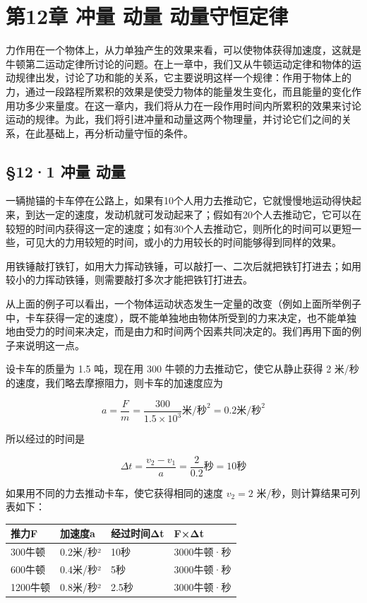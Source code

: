 \chapter{第12章 冲量 动量
动量守恒定律}\label{ux7b2c12ux7ae0-ux51b2ux91cf-ux52a8ux91cf-ux52a8ux91cfux5b88ux6052ux5b9aux5f8b}

力作用在一个物体上，从力单独产生的效果来看，可以使物体获得加速度，这就是牛顿第二运动定律所讨论的问题。在上一章中，我们又从牛顿运动定律和物体的运动规律出发，讨论了功和能的关系，它主要说明这样一个规律：作用于物体上的力，通过一段路程所累积的效果是使受力物体的能量发生变化，而且能量的变化作用功多少来量度。在这一章内，我们将从力在一段作用时间内所累积的效果来讨论运动的规律。为此，我们将引进冲量和动量这两个物理量，并讨论它们之间的关系，在此基础上，再分析动量守恒的条件。

\section{§12·1 冲量 动量}\label{ux51b2ux91cf-ux52a8ux91cf}

一辆抛锚的卡车停在公路上，如果有10个人用力去推动它，它就慢慢地运动得快起来，到达一定的速度，发动机就可发动起来了；假如有20个人去推动它，它可以在较短的时间内获得这一定的速度；如有30个人去推动它，则所化的时间可以更短一些，可见大的力用较短的时间，或小的力用较长的时间能够得到同样的效果。

用铁锤敲打铁钉，如用大力挥动铁锤，可以敲打一、二次后就把铁钉打进去；如用较小的力挥动铁锤，则需要敲打多次才能把铁钉打进去。

从上面的例子可以看出，一个物体运动状态发生一定量的改变（例如上面所举例子中，卡车获得一定的速度），既不能单独地由物体所受到的力来决定，也不能单独地由受力的时间来决定，而是由力和时间两个因素共同决定的。我们再用下面的例子来说明这一点。

设卡车的质量为 1.5 吨，现在用 300 牛顿的力去推动它，使它从静止获得 2
米/秒的速度，我们略去摩擦阻力，则卡车的加速度应为

\[
a = \frac {F}{m} = \frac {300}{1.5 \times 10 ^ {3}} \text{米/秒} ^ {2} = 0.2 \text{米/秒} ^ {2}
\]

所以经过的时间是

\[
\Delta t = \frac {v _ {2} - v _ {1}}{a} = \frac {2}{0.2} \text{秒} = 10 \text{秒}
\]

如果用不同的力去推动卡车，使它获得相同的速度 \(v_{2}=2\)
米/秒，则计算结果可列表如下：

{\def\LTcaptype{none} %
\begin{longtable}[]{@{}llll@{}}
\toprule\noalign{}
推力F & 加速度a & 经过时间Δt & F×Δt \\
\midrule\noalign{}
\endhead
\bottomrule\noalign{}
\endlastfoot
300牛顿 & 0.2米/秒² & 10秒 & 3000牛顿·秒 \\
600牛顿 & 0.4米/秒² & 5秒 & 3000牛顿·秒 \\
1200牛顿 & 0.8米/秒² & 2.5秒 & 3000牛顿·秒 \\
\end{longtable}
}

